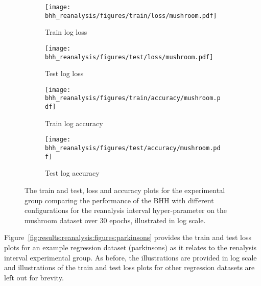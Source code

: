 \begin{figure}[htb]
	\begin{subfigure}{0.5\textwidth}
		\centering
		\texttt{[image: bhh\_reanalysis/figures/train/loss/mushroom.pdf]}
		\caption{Train log loss}
		\label{fig:results:reanalysis:figures:loss:train:mushroom}
	\end{subfigure}
	\begin{subfigure}{0.5\textwidth}
		\centering
		\texttt{[image: bhh\_reanalysis/figures/test/loss/mushroom.pdf]}
		\caption{Test log loss}
		\label{fig:results:reanalysis:figures:loss:test:mushroom}
	\end{subfigure}
	\par\bigskip
	\begin{subfigure}{0.5\textwidth}
		\centering
		\texttt{[image: bhh\_reanalysis/figures/train/accuracy/mushroom.pdf]}
		\caption{Train log accuracy}
		\label{fig:results:reanalysis:figures:accuracy:train:mushroom}
	\end{subfigure}
	\begin{subfigure}{0.5\textwidth}
		\centering
		\texttt{[image: bhh\_reanalysis/figures/test/accuracy/mushroom.pdf]}
		\caption{Test log accuracy}
		\label{fig:results:reanalysis:figures:accuracy:test:mushroom}
	\end{subfigure}
	\par\bigskip
	\caption{The train and test, loss and accuracy plots for the experimental group comparing the performance of the \acs{BHH} with different configurations for the reanalysis interval hyper-parameter on the mushroom dataset over 30 epochs, illustrated in log scale.}
	\label{fig:results:reanalysis:figures:mushroom}
\end{figure}

Figure~\ref{fig:results:reanalysis:figures:parkinsons} provides the train and test loss plots for an example regression dataset (parkinsons) as it relates to the renalysis interval experimental group. As before, the illustrations are provided in log scale and illustrations of the train and test loss plots for other regression datasets are left out for brevity.

